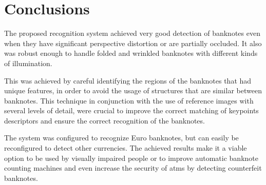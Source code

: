 \section{Conclusions}\label{sec:conclusions}

The proposed recognition system achieved very good detection of banknotes even when they have significant perspective distortion or are partially occluded. It also was robust enough to handle folded and wrinkled banknotes with different kinds of illumination.

This was achieved by careful identifying the regions of the banknotes that had unique features, in order to avoid the usage of structures that are similar between banknotes. This technique in conjunction with the use of reference images with several levels of detail, were crucial to improve the correct matching of keypoints descriptors and ensure the correct recognition of the banknotes.

The system was configured to recognize Euro banknotes, but can easily be reconfigured to detect other currencies.
The achieved results make it a viable option to be used by visually impaired people or to improve automatic banknote counting machines and even increase the security of \glspl{atm} by detecting counterfeit banknotes.
